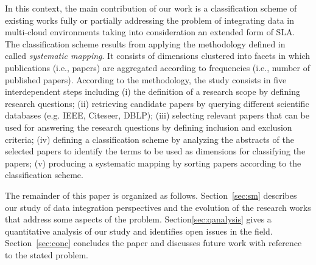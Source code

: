 In this context, the main contribution of our work is
 a classification scheme of existing works fully or partially addressing
the problem of integrating data in multi-cloud environments taking into
consideration an extended form of SLA. 
%
%
The classification scheme results from  applying the  methodology defined
in~\cite{SM:Petersen:2008} called  \textit{systematic mapping}. It consists of dimensions clustered
into facets in which publications (i.e., papers) are aggregated according to
frequencies (i.e., number of published papers). According to the methodology,
the study consists in  five interdependent steps including (i) the definition of
a research scope by defining research questions; (ii) retrieving candidate
papers by querying different scientific databases (e.g. IEEE, Citeseer, DBLP);
(iii) selecting relevant papers that can be used for answering the research
questions by defining inclusion and exclusion criteria; (iv) defining a
classification scheme by analyzing the abstracts of the selected papers to
identify the terms to be used as dimensions for classifying the papers;
(v) producing a systematic mapping by sorting papers according to the
classification scheme.              


The remainder of this paper is organized as follows. Section~\ref{sec:sm}
describes our study of data integration perspectives and the evolution of the
research works that address some aspects of the problem. Section\ref{sec:qanalysis} gives a quantitative
analysis of our study and identifies open issues in the field.
Section~\ref{sec:conc} concludes the paper and discusses future work with
reference to the stated problem.


